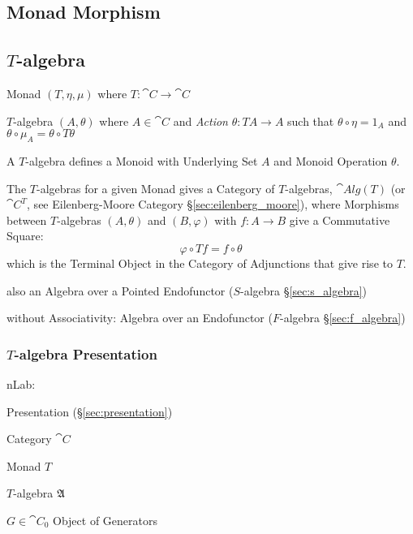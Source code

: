 \subsection{Monad Morphism}\label{sec:monad_morphism}

\subsection{$T$-algebra}\label{sec:t_algebra}

Monad $(T, \eta, \mu)$ where $T : \cat{C} \rightarrow \cat{C}$

$T$-algebra $(A, \theta)$ where $A \in \cat{C}$ and \emph{Action}
$\theta : T A \rightarrow A$ such that $\theta \circ \eta = 1_A$ and
$\theta \circ \mu_A = \theta \circ T \theta$

A $T$-algebra defines a Monoid with Underlying Set $A$ and Monoid
Operation $\theta$.

The $T$-algebras for a given Monad gives a Category of $T$-algebras,
$\cat{Alg}(T)$ (or $\cat{C}^T$, see Eilenberg-Moore Category
\S\ref{sec:eilenberg_moore}), where Morphisms between $T$-algebras
$(A, \theta)$ and $(B, \varphi)$ with $f : A \rightarrow B$ give a
Commutative Square:
\[
  \varphi \circ T f = f \circ \theta
\]
which is the Terminal Object in the Category of Adjunctions that give
rise to $T$.

also an Algebra over a Pointed Endofunctor ($S$-algebra
\S\ref{sec:s_algebra})

without Associativity: Algebra over an Endofunctor
($F$-algebra \S\ref{sec:f_algebra})



\subsubsection{$T$-algebra Presentation}
\label{sec:t_algebra_presentation}

nLab:

Presentation (\S\ref{sec:presentation})

Category $\cat{C}$

Monad $T$

$T$-algebra $\mathfrak{A}$

$G \in \cat{C}_0$ Object of Generators

